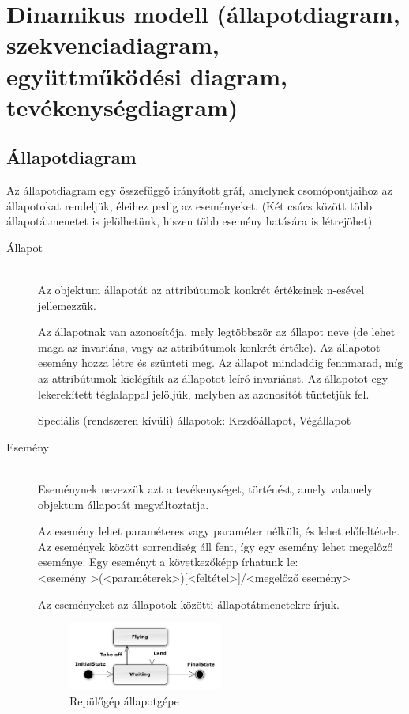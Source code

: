 \documentclass[margin=0px]{article}
\begin{document}
	\section{Dinamikus modell (állapotdiagram, szekvenciadiagram,\\ együttműködési diagram, tevékenységdiagram)}
		
		\subsection{Állapotdiagram}
			Az állapotdiagram egy összefüggő irányított gráf, amelynek csomópontjaihoz az állapotokat rendeljük, éleihez pedig az eseményeket. (Két csúcs között több állapotátmenetet is jelölhetünk, hiszen több esemény hatására is létrejöhet)
			\begin{description}
				\item[Állapot] \hfill \\
					Az objektum állapotát az attribútumok konkrét értékeinek n-esével jellemezzük.
					
					Az állapotnak van azonosítója, mely legtöbbször az állapot neve (de lehet maga az invariáns, vagy az attribútumok konkrét értéke). Az állapotot esemény hozza létre és szünteti meg. Az állapot mindaddig fennmarad, míg az attribútumok kielégítik az állapotot leíró invariánst. Az állapotot egy lekerekített téglalappal jelöljük, melyben az azonosítót tüntetjük fel.
					
					Speciális (rendszeren kívüli) állapotok: Kezdőállapot, Végállapot
				\item[Esemény] \hfill \\
					Eseménynek nevezzük azt a tevékenységet, történést, amely valamely objektum állapotát megváltoztatja.
					
					Az esemény lehet paraméteres vagy paraméter nélküli, és lehet előfeltétele. Az események között sorrendiség áll fent, így egy esemény lehet megelőző eseménye. Egy eseményt a következőképp írhatunk le:\\
					\textless esemény \textgreater (\textless paraméterek\textgreater)[\textless feltétel\textgreater]/\textless megelőző esemény\textgreater
					
					Az eseményeket az állapotok közötti állapotátmenetekre írjuk.
					\begin{figure}[H]
						\centering
						\includegraphics[width=0.5\textwidth]{img/plane.png}
						\caption{Repülőgép állapotgépe}
					\end{figure}
			\end{description}
\end{document}
